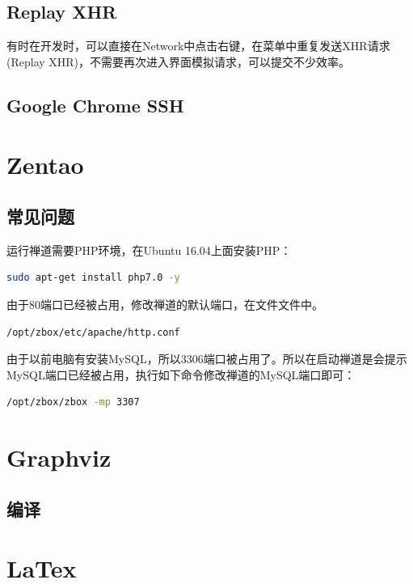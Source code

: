 \documentclass[letter]{book}
\begin{document}
\subsection{Replay XHR}

有时在开发时，可以直接在Network中点击右键，在菜单中重复发送XHR请求(Replay XHR)，不需要再次进入界面模拟请求，可以提交不少效率。

\subsection{Google Chrome SSH}

\section{Zentao}

\subsection{常见问题}

运行禅道需要PHP环境，在Ubuntu 16.04上面安装PHP：

\begin{lstlisting}[language=Bash]
sudo apt-get install php7.0 -y
\end{lstlisting}

由于80端口已经被占用，修改禅道的默认端口，在文件文件中。

\begin{lstlisting}
/opt/zbox/etc/apache/http.conf
\end{lstlisting}

由于以前电脑有安装MySQL，所以3306端口被占用了。所以在启动禅道是会提示MySQL端口已经被占用，执行如下命令修改禅道的MySQL端口即可：

\begin{lstlisting}[language=Bash]
/opt/zbox/zbox -mp 3307
\end{lstlisting}

\section{Graphviz}

\subsection{编译}




\section{LaTex}
\end{document}
